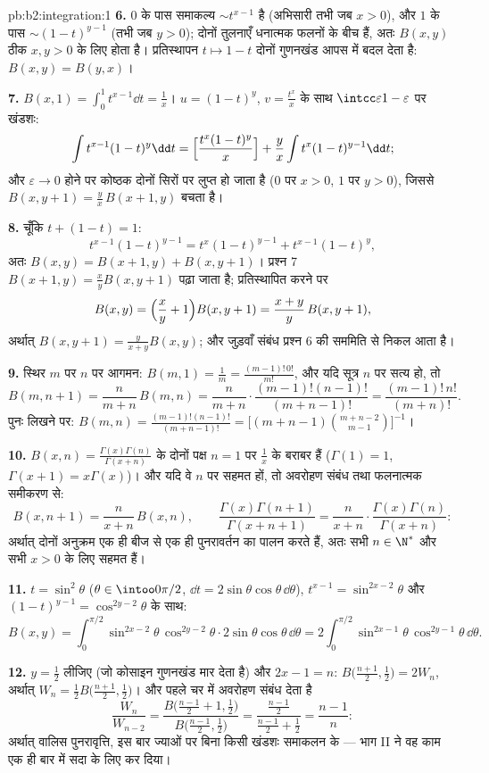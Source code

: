 \begin{solution}{pb:b2:integration:1}
\textbf{6.} $0$ के पास समाकल्य $\sim t^{x-1}$ है (अभिसारी तभी जब $x > 0$), और $1$ के
पास $\sim (1-t)^{y-1}$ (तभी जब $y > 0$); दोनों तुलनाएँ धनात्मक फलनों के बीच हैं, अतः $B(x,y)$
ठीक $x, y > 0$ के लिए  होता है। प्रतिस्थापन $t \mapsto 1 - t$ दोनों गुणनखंड आपस में
बदल देता है: $B(x,y) = B(y,x)$।

\textbf{7.} $B(x,1) = \int_0^1 t^{x-1}\dd t = \frac1x$। $u = (1-t)^y$, $v =
\frac{t^x}{x}$ के साथ $\intcc\varepsilon{1-\varepsilon}$ पर खंडशः:
\[
\int t^{x-1}(1-t)^{y}\dd t
= \Bigl[\frac{t^x(1-t)^y}{x}\Bigr]
+ \frac{y}{x}\int t^{x}(1-t)^{y-1}\dd t ;
\]
और $\varepsilon \to 0$ होने पर कोष्ठक दोनों सिरों पर लुप्त हो जाता है ($0$ पर $x >
0$, $1$
पर $y > 0$), जिससे $B(x, y+1) = \frac
yx\,B(x+1, y)$ बचता है।

\textbf{8.} चूँकि $t + (1-t) = 1$:
\[
t^{x-1}(1-t)^{y-1} = t^{x}(1-t)^{y-1} + t^{x-1}(1-t)^{y},
\]
अतः $B(x,y) = B(x+1,y) + B(x,y+1)$। प्रश्न 7 $B(x+1,y) =
\frac xy B(x,y+1)$ पढ़ा जाता है; प्रतिस्थापित करने पर
\[
B(x,y) = \Bigl(\frac xy + 1\Bigr)B(x,y+1)
= \frac{x+y}{y}\,B(x,y+1),
\]
अर्थात् $B(x,y+1) = \frac{y}{x+y}B(x,y)$; और जुड़वाँ संबंध प्रश्न 6 की सममिति से निकल आता है।

\textbf{9.} स्थिर $m$ पर $n$ पर आगमन: $B(m,1) = \frac1m =
\frac{(m-1)!\,0!}{m!}$, और यदि सूत्र $n$ पर सत्य हो,
तो
\[
B(m, n+1) = \frac{n}{m+n}\,B(m,n)
= \frac{n}{m+n}\cdot\frac{(m-1)!(n-1)!}{(m+n-1)!}
= \frac{(m-1)!\,n!}{(m+n)!} .
\]
पुनः लिखने पर: $B(m,n) = \frac{(m-1)!(n-1)!}{(m+n-1)!} =
\bigl[(m+n-1)\binom{m+n-2}{m-1}\bigr]^{-1}$।

\textbf{10.} $B(x,n) =
\frac{\Gamma(x)\Gamma(n)}{\Gamma(x+n)}$ के दोनों पक्ष $n =
1$ पर $\frac1x$ के बराबर हैं ($\Gamma(1) = 1$, $\Gamma(x+1) = x\Gamma(x)$)। और
यदि वे $n$ पर सहमत हों, तो अवरोहण संबंध तथा फलनात्मक समीकरण से:
\[
B(x, n+1) = \frac{n}{x+n}\,B(x,n), \qquad
\frac{\Gamma(x)\Gamma(n+1)}{\Gamma(x+n+1)}
= \frac{n}{x+n}\cdot
\frac{\Gamma(x)\Gamma(n)}{\Gamma(x+n)} :
\]
अर्थात् दोनों अनुक्रम एक ही बीज से एक ही पुनरावर्तन का पालन करते हैं, अतः
सभी $n \in \N^*$ और सभी $x > 0$ के लिए सहमत हैं।

\textbf{11.} $t = \sin^2\theta$ ($\theta \in
\intoo0{\pi/2}$, $\dd t = 2\sin\theta\cos\theta\,\dd\theta$), $t^{x-1} = \sin^{2x-2}\theta$ और $(1-t)^{y-1} =
\cos^{2y-2}\theta$ के साथ:
\[
B(x,y) = \int_0^{\pi/2}\sin^{2x-2}\theta\,\cos^{2y-2}\theta
\cdot 2\sin\theta\cos\theta\,\dd\theta
= 2\int_0^{\pi/2}\sin^{2x-1}\theta\,\cos^{2y-1}\theta\,
\dd\theta .
\]

\textbf{12.} $y = \frac12$ लीजिए (जो कोसाइन गुणनखंड मार देता है) और $2x - 1 = n$: $B\bigl(\frac{n+1}2, \frac12\bigr) = 2W_n$,
अर्थात् $W_n = \frac12 B\bigl(\frac{n+1}2,\frac12\bigr)$। और पहले चर में अवरोहण संबंध देता है
\[
\frac{W_n}{W_{n-2}}
= \frac{B\bigl(\frac{n-1}2 + 1, \frac12\bigr)}
{B\bigl(\frac{n-1}2, \frac12\bigr)}
= \frac{\frac{n-1}2}{\frac{n-1}2 + \frac12}
= \frac{n-1}{n} :
\]
अर्थात् वालिस पुनरावृत्ति, इस बार ज्याओं पर बिना किसी खंडशः समाकलन के
--- भाग II ने वह काम एक ही बार में सदा के लिए कर दिया।


\end{solution}
